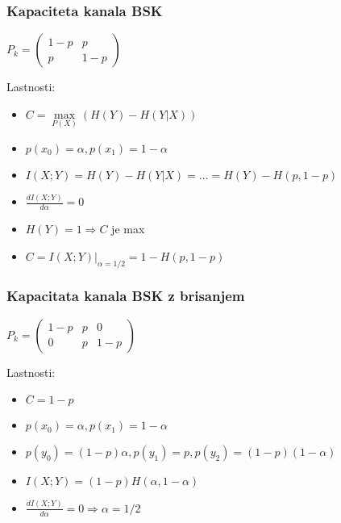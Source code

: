 \documentclass{article}
\begin{document}
\begin{multicols}{4}
\subsubsection{Kapaciteta kanala BSK}
\begin{center}
    \begin{math}
        P_k = 
                \begin{pmatrix}
                    1-p & p\\
                    p & 1-p 
                \end{pmatrix}
    \end{math}
\end{center}
Lastnosti:
\begin{itemize}
    \item $C =\underset{P(X)}{\max} (H(Y) - H(Y|X))$
    \item $p(x_0) = \alpha, p(x_1) = 1 - \alpha$
    \item $I(X;Y) = H(Y) - H(Y|X) = \dots = H(Y) - H(p, 1-p)$
    \item $\frac{dI(X;Y)}{d \alpha} = 0$
    \item $H(Y) = 1 \Rightarrow C$ je max
    \item $C=I(X;Y) |_{\alpha = 1/2} = 1 - H(p, 1-p)$
\end{itemize}
\subsubsection{Kapacitata kanala BSK z brisanjem}
\begin{center}
    \begin{math}
        P_k = 
                \begin{pmatrix}
                    1-p & p & 0\\
                    0   & p & 1-p
                \end{pmatrix}
    \end{math}
\end{center}
Lastnosti:
\begin{itemize}
    \item $C = 1 - p$
    \item $p(x_0) = \alpha, p(x_1) = 1 - \alpha$
    \item $p(y_0) = (1-p)\alpha, p(y_1) = p, p(y_2) = (1-p)(1-\alpha)$
    \item $I(X;Y) = (1-p)H(\alpha, 1 - \alpha)$
    \item $\frac{dI(X;Y)}{d \alpha} = 0 \Rightarrow \alpha = 1/2$
\end{itemize}


\end{multicols}
\end{document}
